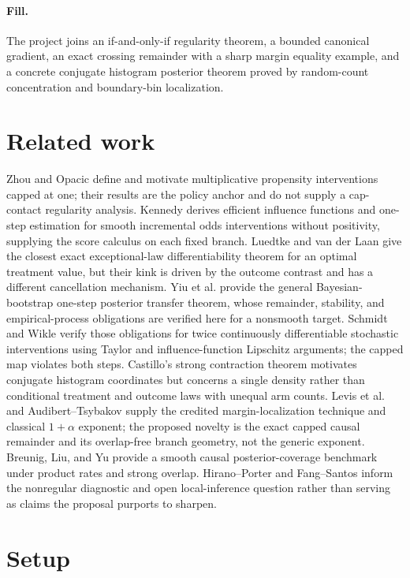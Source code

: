 \documentclass{article}
\begin{document}
\paragraph{Fill.} The project joins an if-and-only-if regularity theorem, a bounded canonical gradient, an exact crossing remainder with a sharp margin equality example, and a concrete conjugate histogram posterior theorem proved by random-count concentration and boundary-bin localization.

\section{Related work}

Zhou and Opacic define and motivate multiplicative propensity interventions capped at one; their results are the policy anchor and do not supply a cap-contact regularity analysis. Kennedy derives efficient influence functions and one-step estimation for smooth incremental odds interventions without positivity, supplying the score calculus on each fixed branch. Luedtke and van der Laan give the closest exact exceptional-law differentiability theorem for an optimal treatment value, but their kink is driven by the outcome contrast and has a different cancellation mechanism. Yiu et al. provide the general Bayesian-bootstrap one-step posterior transfer theorem, whose remainder, stability, and empirical-process obligations are verified here for a nonsmooth target. Schmidt and Wikle verify those obligations for twice continuously differentiable stochastic interventions using Taylor and influence-function Lipschitz arguments; the capped map violates both steps. Castillo's strong contraction theorem motivates conjugate histogram coordinates but concerns a single density rather than conditional treatment and outcome laws with unequal arm counts. Levis et al. and Audibert--Tsybakov supply the credited margin-localization technique and classical \(1+\alpha\) exponent; the proposed novelty is the exact capped causal remainder and its overlap-free branch geometry, not the generic exponent. Breunig, Liu, and Yu provide a smooth causal posterior-coverage benchmark under product rates and strong overlap. Hirano--Porter and Fang--Santos inform the nonregular diagnostic and open local-inference question rather than serving as claims the proposal purports to sharpen.

\section{Setup}
\end{document}

